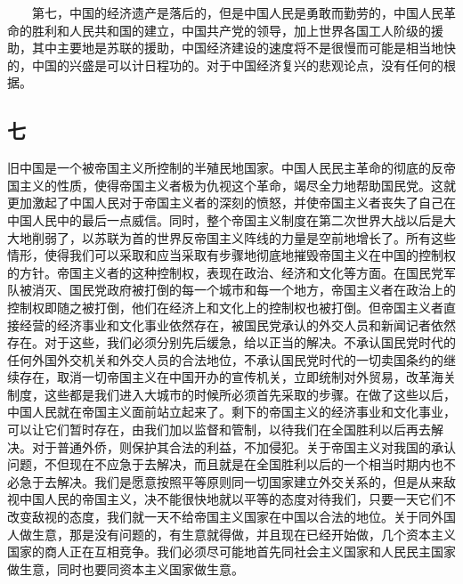 \documentclass[cn,11pt,chinese]{elegantbook}
\def\myformat#1{\hfil\hfil #1}
\begin{document}
　　第七，中国的经济遗产是落后的，但是中国人民是勇敢而勤劳的，中国人民革命的胜利和人民共和国的建立，中国共产党的领导，加上世界各国工人阶级的援助，其中主要地是苏联的援助，中国经济建设的速度将不是很慢而可能是相当地快的，中国的兴盛是可以计日程功的。对于中国经济复兴的悲观论点，没有任何的根据。\\
\subsection*{\myformat{七 }}
旧中国是一个被帝国主义所控制的半殖民地国家。中国人民民主革命的彻底的反帝国主义的性质，使得帝国主义者极为仇视这个革命，竭尽全力地帮助国民党。这就更加激起了中国人民对于帝国主义者的深刻的愤怒，并使帝国主义者丧失了自己在中国人民中的最后一点威信。同时，整个帝国主义制度在第二次世界大战以后是大大地削弱了，以苏联为首的世界反帝国主义阵线的力量是空前地增长了。所有这些情形，使得我们可以采取和应当采取有步骤地彻底地摧毁帝国主义在中国的控制权的方针。帝国主义者的这种控制权，表现在政治、经济和文化等方面。在国民党军队被消灭、国民党政府被打倒的每一个城市和每一个地方，帝国主义者在政治上的控制权即随之被打倒，他们在经济上和文化上的控制权也被打倒。但帝国主义者直接经营的经济事业和文化事业依然存在，被国民党承认的外交人员和新闻记者依然存在。对于这些，我们必须分别先后缓急，给以正当的解决。不承认国民党时代的任何外国外交机关和外交人员的合法地位，不承认国民党时代的一切卖国条约的继续存在，取消一切帝国主义在中国开办的宣传机关，立即统制对外贸易，改革海关制度，这些都是我们进入大城市的时候所必须首先采取的步骤。在做了这些以后，中国人民就在帝国主义面前站立起来了。剩下的帝国主义的经济事业和文化事业，可以让它们暂时存在，由我们加以监督和管制，以待我们在全国胜利以后再去解决。对于普通外侨，则保护其合法的利益，不加侵犯。关于帝国主义对我国的承认问题，不但现在不应急于去解决，而且就是在全国胜利以后的一个相当时期内也不必急于去解决。我们是愿意按照平等原则同一切国家建立外交关系的，但是从来敌视中国人民的帝国主义，决不能很快地就以平等的态度对待我们，只要一天它们不改变敌视的态度，我们就一天不给帝国主义国家在中国以合法的地位。关于同外国人做生意，那是没有问题的，有生意就得做，并且现在已经开始做，几个资本主义国家的商人正在互相竞争。我们必须尽可能地首先同社会主义国家和人民民主国家做生意，同时也要同资本主义国家做生意。\\
\end{document}

